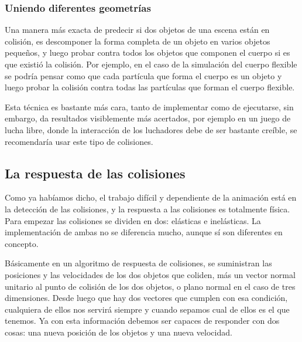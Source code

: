 \subsubsection{Uniendo diferentes geometrías}
Una manera más exacta de predecir si dos objetos de una escena están en colisión, es descomponer la forma completa de un objeto en varios objetos pequeños, y luego probar contra todos los objetos que componen el cuerpo si es que existió la colisión.
Por ejemplo, en el caso de la simulación del cuerpo flexible se podría pensar como que cada partícula que forma el cuerpo es un objeto y luego probar la colisión contra todas las partículas que forman el cuerpo flexible.

Esta técnica es bastante más cara, tanto de implementar como de ejecutarse, sin embargo, da resultados visiblemente más acertados, por ejemplo en un juego de lucha libre, donde la interacción de los luchadores debe de ser bastante creíble, se recomendaría usar este tipo de colisiones.

\subsection{La respuesta de las colisiones}

Como ya habíamos dicho, el trabajo difícil y dependiente de la animación está en la detección de las colisiones, y la respuesta a las colisiones es totalmente física.
Para empezar las colisiones se dividen en dos: elásticas e inelásticas.
La implementación de ambas no se diferencia mucho, aunque sí son diferentes en concepto.

Básicamente en un algoritmo de respuesta de colisiones, se suministran las posiciones y las velocidades de los dos objetos que coliden, más un vector normal unitario al punto de colisión de los dos objetos, o plano normal en el caso de tres dimensiones.
Desde luego que hay dos vectores que cumplen con esa condición, cualquiera de ellos nos servirá siempre y cuando sepamos cual de ellos es el que tenemos.
Ya con esta información debemos ser capaces de responder con dos cosas: una nueva posición de los objetos y una nueva velocidad.

